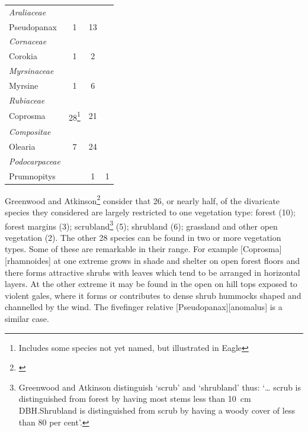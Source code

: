 \begin{xltabular}{\textwidth}{ X c c c }
	\emph{Araliaceae} \\
	\hspace{3mm}Pseudopanax & 1 & 13 \\
	\emph{Cornaceae} \\
	\hspace{3mm}Corokia & 1 & 2 \\
	\emph{Myrsinaceae} \\
	\hspace{3mm}Myrsine & 1 & 6 \\
	\emph{Rubiaceae} \\
	\hspace{3mm}Coprosma & 28\footnote{Includes some species not yet named, but illustrated in Eagle} & 21 \\
	\emph{Compositae} \\
	\hspace{3mm}Olearia & 7 & 24 \\
	\emph{Podocarpaceae} \\
	\hspace{3mm}Prumnopitys &  & 1 & 1 \\
	\bottomrule
\end{xltabular}

Greenwood and Atkinson\footnote{\cite{greenwood1977evolution}} consider that 26, or nearly half, of the divaricate species they considered are largely restricted to one vegetation type: forest (10); forest margins (3); scrubland\footnote{Greenwood and Atkinson distinguish `scrub' and `shrubland' thus: `… scrub is distinguished from forest by having most stems less than \SI{10}{\centi\metre} DBH.\@ Shrubland is distinguished from scrub by having a woody cover of less than 80 per cent'.} (5); shrubland (6); grassland and other open vegetation (2).
The other 28 species can be found in two or more vegetation types.
Some of these are remarkable in their range.
For example [Coprosma][rhamnoides] at one extreme grows in shade and shelter on open forest floors and there forms attractive shrubs with leaves which tend to be arranged in horizontal layers.
At the other extreme it may be found in the open on hill tops exposed to violent gales, where it forms or contributes to dense shrub hummocks shaped and channelled by the wind.
The fivefinger relative [Pseudopanax][anomalus] is a similar case.

